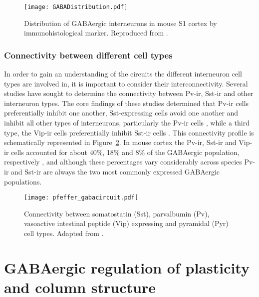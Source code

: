 \begin{figure}
	\centering
        \texttt{[image: GABADistribution.pdf]}
	\caption{Distribution of GABAergic interneurons in mouse S1 cortex
      by immunohistological marker. Reproduced from \cite{Rudy2011}.}
	\label{GABADistribution}
\end{figure}

\subsubsection*{Connectivity between different cell types}

In order to gain an understanding of the circuits the different
interneuron cell types are involved in, it is important to consider
their interconnectivity. Several studies have sought to determine the
connectivity between Pv-ir, Sst-ir and other interneuron types. The
core findings of these studies determined that Pv-ir cells
preferentially inhibit one another, Sst-expressing cells avoid one
another and inhibit all other types of interneurons, particularly the
Pv-ir cells \citep{Xu2013}, while a third type, the Vip-ir cells
preferentially inhibit Sst-ir cells \citep{Pfeffer2013}. This
connectivity profile is schematically represented in
Figure~\ref{gaba_circuit}. In mouse cortex the Pv-ir, Sst-ir and
Vip-ir cells accounted for about 40\%, 18\% and 8\% of the GABAergic
population, respectively \citep{Xu2010}, and although these
percentages vary considerably across species Pv-ir and Sst-ir are
always the two most commonly expressed GABAergic populations.

\begin{figure}
	\centering
        \texttt{[image: pfeffer\_gabacircuit.pdf]}
	\caption{Connectivity between somatostatin (Sst),
        parvalbumin (Pv), vasoactive intestinal peptide (Vip)
        expressing and pyramidal (Pyr) cell types. Adapted from
        \cite{Pfeffer2013}.}
	\label{gaba_circuit}
\end{figure}

\section{GABAergic regulation of plasticity and column structure}

